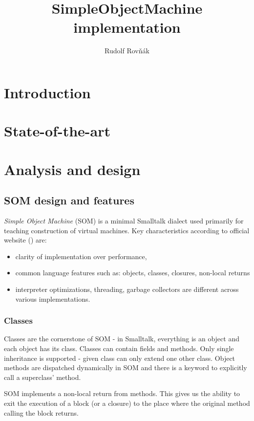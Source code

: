 \documentclass[thesis=M,english]{FITthesis}[2019/12/23]
\title{SimpleObjectMachine implementation}
\author{Rudolf Rovňák} %
\begin{document}

\chapter{Introduction}



\chapter{State-of-the-art}

\chapter{Analysis and design}
\section{SOM design and features}
\textit{Simple Object Machine} (SOM) is a minimal Smalltalk dialect used primarily for teaching construction of virtual machines. Key characteristics
according to official website (\cite{som-github}) are:
\begin{itemize}
	\item clarity of implementation over performance,
	\item common language features such as: objects, classes, closures, non-local returns
	\item interpreter optimizations, threading, garbage collectors are different
		across various implementations.
\end{itemize}

\subsection{Classes}
Classes are the cornerstone of SOM - in Smalltalk, everything is an object and each object has its class. Classes can contain fields and methods.
Only single inheritance is supported - given class can only extend one other class. Object methods are dispatched dynamically in SOM and there is
a keyword to explicitly call a superclass' method. 

SOM implements a non-local return from methods. This gives us the ability to exit the execution of a block (or a closure) to the place where the
original method calling the block returns.
\end{document}
